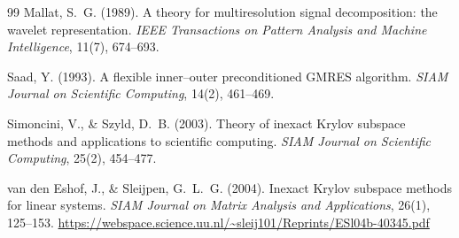 \documentclass[11pt,a4paper]{article}
\begin{document}
\begin{thebibliography}{99}
Mallat, S.~G. (1989).
A theory for multiresolution signal decomposition: the wavelet representation.
\emph{IEEE Transactions on Pattern Analysis and Machine Intelligence},
11(7), 674--693.

Saad, Y. (1993).
A flexible inner--outer preconditioned GMRES algorithm.
\emph{SIAM Journal on Scientific Computing}, 14(2), 461--469.

Simoncini, V., \& Szyld, D.~B. (2003).
Theory of inexact Krylov subspace methods and applications to scientific
computing.
\emph{SIAM Journal on Scientific Computing}, 25(2), 454--477.

van den Eshof, J., \& Sleijpen, G.~L.~G. (2004).
Inexact Krylov subspace methods for linear systems.
\emph{SIAM Journal on Matrix Analysis and Applications}, 26(1), 125--153.
\url{https://webspace.science.uu.nl/~sleij101/Reprints/ESl04b-40345.pdf}

\end{thebibliography}
\end{document}
